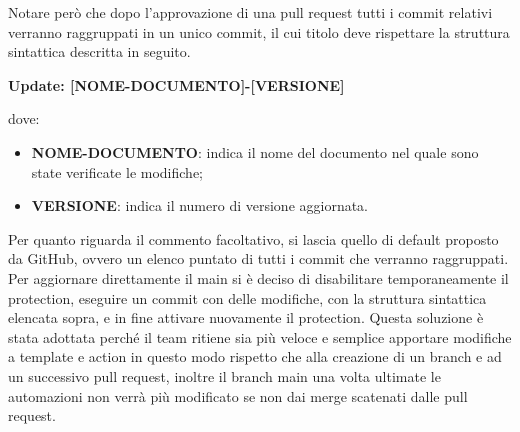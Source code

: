         Notare però che dopo l'approvazione di una pull request tutti i commit
        relativi verranno raggruppati in un unico commit, il cui titolo deve rispettare la struttura sintattica descritta in
        seguito.
        \begin{center}
            \textbf{Update: [NOME-DOCUMENTO]-[VERSIONE]}
        \end{center}
        dove:

        \begin{itemize}
            \item \textbf{NOME-DOCUMENTO}: indica il nome del documento nel quale sono state verificate le modifiche;
            \item \textbf{VERSIONE}: indica il numero di versione aggiornata.
        \end{itemize}
        Per quanto riguarda il commento facoltativo, si lascia quello di default proposto da GitHub, 
        ovvero un elenco puntato di tutti i commit che verranno raggruppati.\\
        

        Per aggiornare direttamente il main si è deciso di disabilitare temporaneamente
        il protection, eseguire un commit con delle modifiche, con la struttura sintattica elencata sopra, e in fine attivare nuovamente il protection.
        Questa soluzione è stata adottata perché il team ritiene sia più veloce e semplice apportare modifiche a template e action in questo modo
        rispetto che alla creazione di un branch e ad un successivo pull request, inoltre il branch main una volta ultimate le automazioni non verrà più modificato se non dai merge
        scatenati dalle pull request.

